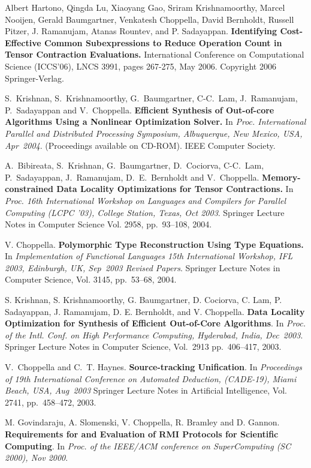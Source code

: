 \documentclass[11pt,margin,line]{res}
\begin{document}
\begin{resume}
Albert Hartono, Qingda Lu, Xiaoyang Gao, Sriram
Krishnamoorthy, Marcel Nooijen, Gerald Baumgartner,
Venkatesh Choppella, David Bernholdt, Russell Pitzer,
J. Ramanujam, Atanas Rountev, and P. Sadayappan.  {\bf
Identifying Cost-Effective Common Subexpressions to Reduce
Operation Count in Tensor Contraction Evaluations.}
International Conference on Computational Science (ICCS'06),
LNCS 3991, pages 267-275, May 2006.  Copyright 2006
Springer-Verlag.

S.~Krishnan, S.~Krishnamoorthy, G.~Baumgartner, C-C.~Lam,
J.~Ramanujam, P.~Sadayappan and V.~Choppella.  {\bf
Efficient Synthesis of Out-of-core Algorithms Using a
Nonlinear Optimization Solver.}  In {\em
{Proc. International Parallel and Distributed Processing
Symposium, Albuquerque, New Mexico, USA, Apr~2004}}.
(Proceedings available on CD-ROM).  IEEE Computer Society.

A.~Bibireata, S.~Krishnan, G.~Baumgartner, D.~Cociorva,
C-C.~Lam, P.~Sadayappan, J.~Ramanujam, D.~E.~Bernholdt and
V.~Choppella.  {\bf Memory-constrained Data Locality
Optimizations for Tensor Contractions.}  In {\em {Proc. 16th
International Workshop on Languages and Compilers for
Parallel Computing (LCPC '03), College Station, Texas, Oct
2003}}.  Springer Lecture Notes in Computer Science
Vol. 2958, pp.~93--108, 2004.

V. Choppella.  {\bf Polymorphic Type Reconstruction Using
Type Equations.}  In {\em {Implementation of Functional
Languages 15th International Workshop, IFL 2003, Edinburgh,
UK, Sep~2003 Revised Papers}}.  Springer Lecture Notes in
Computer Science, Vol. 3145, pp.~53--68, 2004.

S. Krishnan, S. Krishnamoorthy, G. Baumgartner, D. Cociorva,
C. Lam, P.  Sadayappan, J. Ramanujam, D. E. Bernholdt, and
V. Choppella.  {\bf Data Locality Optimization for Synthesis
of Efficient Out-of-Core Algorithms}. In {\em {Proc. of the
Intl. Conf. on High Performance Computing, Hyderabad, India,
Dec~2003}}.  Springer Lecture Notes in Computer Science,
Vol.~2913 pp.~406--417, 2003.

V.~Choppella and C.~T. Haynes. {\bf Source-tracking
  Unification}.  In {\em {Proceedings of 19th International
    Conference on Automated Deduction, (CADE-19), Miami
    Beach, USA, Aug~2003}} Springer Lecture Notes in
Artificial Intelligence, Vol. 2741, pp.~458--472, 2003.

M. Govindaraju, A. Slomenski, V. Choppella, R. Bramley and
  D. Gannon.  {\bf Requirements for and Evaluation of RMI
  Protocols for Scientific Computing}. In {\em {Proc. of the
  IEEE/ACM conference on SuperComputing (SC 2000), Nov
  2000}}.


\end{resume}
\end{document}
